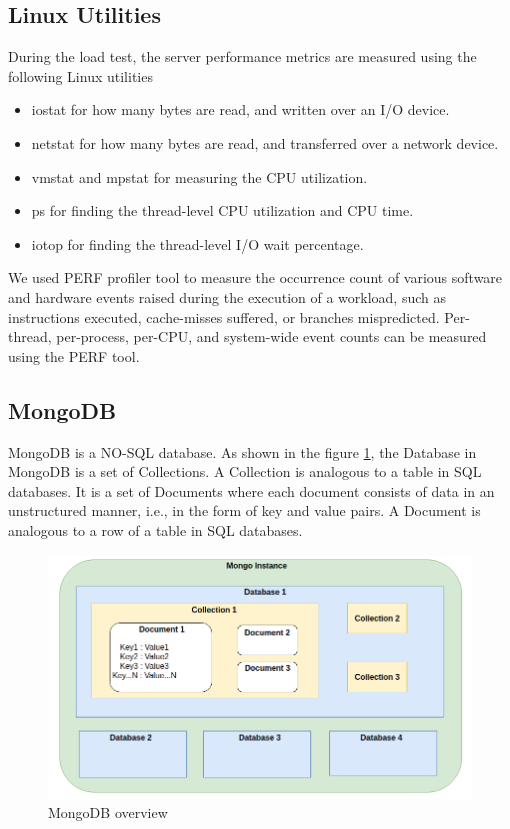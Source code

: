 \documentclass{iitbreport}
\begin{document}
\subsection{Linux Utilities}
During the load test, the server performance metrics are measured using the following  Linux utilities 
\begin{itemize}
    \item iostat \cite{iostat}  for how many bytes are read, and written over an I/O device.
    \item netstat \cite{netstat} for how many bytes are read, and transferred over a network device.
    \item vmstat \cite{vmstat} and mpstat \cite{mpstat} for measuring the CPU utilization.
    \item ps \cite{ps} for finding the  thread-level CPU utilization and CPU time.
    \item iotop \cite{iotop} for finding the thread-level I/O wait percentage.
\end{itemize}

We used PERF\cite{PERF} profiler  tool to measure the occurrence count of various software and hardware events raised during the execution of a workload, such as instructions executed, cache-misses suffered, or branches mispredicted. Per-thread, per-process, per-CPU, and system-wide event counts can be measured using the PERF tool. 

\subsection{MongoDB}
MongoDB \cite{mongo_db} is a NO-SQL database. As shown in the figure \ref{fig:mongodb}, the Database in MongoDB is a set of Collections. A Collection is analogous to a table in SQL databases. It is a set of Documents where each document consists of  data in an unstructured manner, i.e., in the form of key and value pairs. A Document is analogous to a row of a table in SQL databases.
\begin{figure}[!htb]
            \centering
            \includegraphics[width=\linewidth]{Images/mongo_db.png}
            \caption{MongoDB overview}
            \label{fig:mongodb}
\end{figure}
\end{document}
